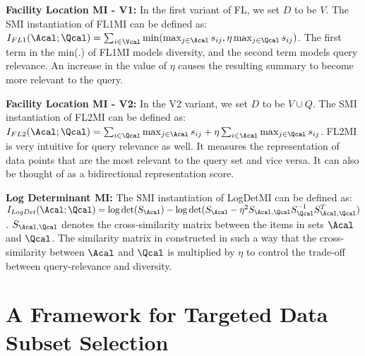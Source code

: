 \documentclass{article}
\begin{document}
\noindent\textbf{Facility Location MI - V1:} In the first variant of FL, we set $D$ to be $V$. The SMI instantiation of FL1MI can be defined as: $I_{FL1}(\Acal;\Qcal)=\sum_{i \in \Vcal}\min(\max_{j \in \Acal}s_{ij}, \eta \max_{j \in \Qcal}s_{ij})$.
The first term in the min(.) of FL1MI models diversity, and the second term models query relevance. An increase in the value of $\eta$ causes the resulting summary to become more relevant to the query.

\noindent\textbf{Facility Location MI - V2:} In the V2 variant, we set $D$ to be $V \cup Q$. The SMI instantiation of FL2MI can be defined as: $I_{FL2}(\Acal;\Qcal)=\sum_{i \in \Qcal} \max_{j \in \Acal} s_{ij} + \eta\sum_{i \in \Acal} \max_{j \in \Qcal} s_{ij}$.
FL2MI is very intuitive for query relevance as well. It measures the representation of data points that are the most relevant to the query set and vice versa. It can also be thought of as a bidirectional representation score.

\noindent\textbf{Log Determinant MI:} The SMI instantiation of LogDetMI can be defined as: $I_{LogDet}(\Acal;\Qcal)=\log\det(S_{\Acal}) -\log\det(S_{\Acal} - \eta^2 S_{\Acal,\Qcal}S_{\Qcal}^{-1}S_{\Acal,\Qcal}^T)$.
$S_{\Acal, \Qcal}$ denotes the cross-similarity matrix between the items in sets $\Acal$ and $\Qcal$. The similarity matrix in constructed in such a way that the cross-similarity between $\Acal$ and $\Qcal$ is multiplied by $\eta$ to control the trade-off between query-relevance and diversity.

\section{A Framework for Targeted Data Subset Selection}
\end{document}
